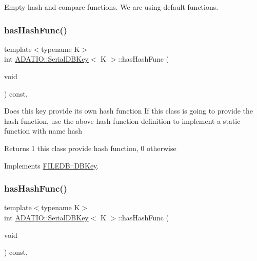 Empty hash and compare functions. We are using default functions. \mbox{\label{classADATIO_1_1SerialDBKey_ae8926cd9bdef006f3729f4b724a2e2fe}} 
\subsubsection{\texorpdfstring{hasHashFunc()}{hasHashFunc()}\hspace{0.1cm}{\footnotesize\ttfamily [1/2]}}
{\footnotesize\ttfamily template$<$typename K$>$ \\
int \mbox{\hyperlink{classADATIO_1_1SerialDBKey}{A\+D\+A\+T\+I\+O\+::\+Serial\+D\+B\+Key}}$<$ K $>$\+::has\+Hash\+Func (\begin{DoxyParamCaption}\item[{void}]{ }\end{DoxyParamCaption}) const\hspace{0.3cm}{\ttfamily [inline]}, {\ttfamily [virtual]}}

Does this key provide its own hash function If this class is going to provide the hash function, use the above hash function definition to implement a static function with name hash

\begin{DoxyReturn}{Returns}
1 this class provide hash function, 0 otherwise 
\end{DoxyReturn}


Implements \mbox{\hyperlink{classFILEDB_1_1DBKey_a541dab4f4083ae951dee2f30483eb18e}{F\+I\+L\+E\+D\+B\+::\+D\+B\+Key}}.

\mbox{\label{classADATIO_1_1SerialDBKey_ae8926cd9bdef006f3729f4b724a2e2fe}} 
\subsubsection{\texorpdfstring{hasHashFunc()}{hasHashFunc()}\hspace{0.1cm}{\footnotesize\ttfamily [2/2]}}
{\footnotesize\ttfamily template$<$typename K$>$ \\
int \mbox{\hyperlink{classADATIO_1_1SerialDBKey}{A\+D\+A\+T\+I\+O\+::\+Serial\+D\+B\+Key}}$<$ K $>$\+::has\+Hash\+Func (\begin{DoxyParamCaption}\item[{void}]{ }\end{DoxyParamCaption}) const\hspace{0.3cm}{\ttfamily [inline]}, {\ttfamily [virtual]}}

